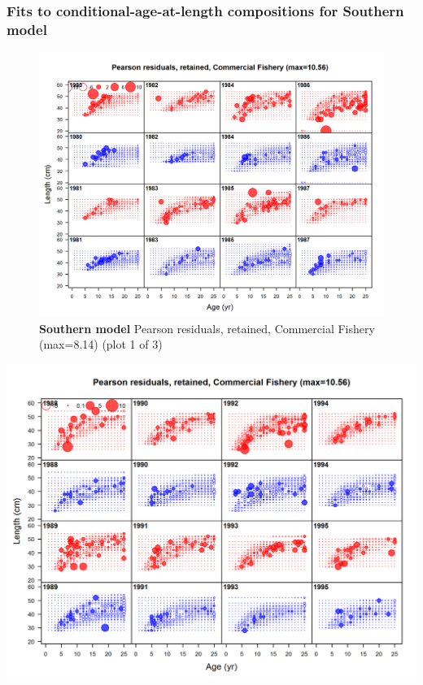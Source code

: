 \documentclass[12pt,]{article}
\begin{document}
\FloatBarrier

\newpage

\subsubsection{Fits to conditional-age-at-length compositions for
Southern
model}\label{fits-to-conditional-age-at-length-compositions-for-southern-model}

\begin{figure}[htbp]
\centering
\includegraphics{./r4ss/plots_mod2/comp_condAALfit_residsflt2mkt2_page1.png}
\caption{\textbf{Southern model} Pearson residuals, retained, Commercial
Fishery (max=8.14) (plot 1 of 3)
\label{fig:mod2_1_comp_condAALfit_residsflt2mkt2_page1}}
\end{figure}

\includegraphics{./r4ss/plots_mod2/comp_condAALfit_residsflt2mkt2_page2.png}
\end{document}
